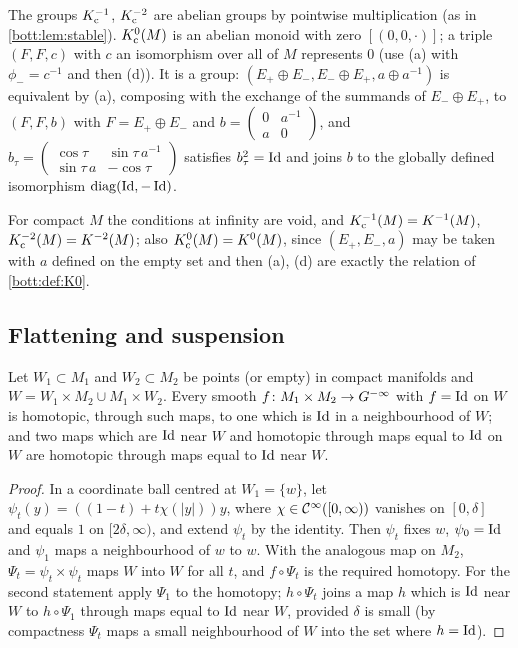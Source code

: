 The groups $K_{\mathrm{c}}^{-1}$, $K_{\mathrm{c}}^{-2}$ are abelian groups by pointwise multiplication (as in
\cref{bott:lem:stable}). $K_{\mathrm{c}}^0(M)$ is an abelian monoid with zero $[(0,0,\cdot)]$; a
triple $(F,F,c)$ with $c$ an isomorphism over all of $M$ represents $0$ (use (a) with
$\phi_-=c^{-1}$ and then (d)). It is a group: $(E_+\oplus E_-,E_-\oplus E_+,a\oplus a^{-1})$ is
equivalent by (a), composing with the exchange of the summands of $E_-\oplus E_+$, to
$(F,F,b)$ with $F=E_+\oplus E_-$ and $b=\begin{pmatrix}0&a^{-1}\\a&0\end{pmatrix}$, and
$b_\tau=\begin{pmatrix}\cos\tau&\sin\tau\,a^{-1}\\\sin\tau\,a&-\cos\tau\end{pmatrix}$ satisfies
$b_\tau^2=\operatorname{Id}$ and joins $b$ to the globally defined isomorphism $\operatorname{diag}(\operatorname{Id},-\operatorname{Id})$.

For compact $M$ the conditions at infinity are void, and $K_{\mathrm{c}}^{-1}(M)=K^{-1}(M)$,
$K_{\mathrm{c}}^{-2}(M)=K^{-2}(M)$; also $K_{\mathrm{c}}^0(M)=K^0(M)$, since $(E_+,E_-,a)$ may be taken with $a$
defined on the empty set and then (a), (d) are exactly the relation of \cref{bott:def:K0}.

\subsection{Flattening and suspension}
\begin{lemma}[Flattening]\label{bott:lem:flatten}
  Let $W_1\subset M_1$ and $W_2\subset M_2$ be points (or empty) in compact manifolds and
  $W=W_1\times M_2\cup M_1\times W_2$. Every smooth $f\colon M_1\times M_2\to G^{-\infty}$ with $f=\operatorname{Id}$
  on $W$ is homotopic, through such maps, to one which is $\operatorname{Id}$ in a neighbourhood of $W$;
  and two maps which are $\operatorname{Id}$ near $W$ and homotopic through maps equal to $\operatorname{Id}$ on $W$ are
  homotopic through maps equal to $\operatorname{Id}$ near $W$.
\end{lemma}
\begin{proof}
  In a coordinate ball centred at $W_1=\{w\}$, let $\psi_t(y)=((1-t)+t\chi(|y|))y$, where
  $\chi\in\mathcal{C}^\infty([0,\infty))$ vanishes on $[0,\delta]$ and equals $1$ on $[2\delta,\infty)$, and
  extend $\psi_t$ by the identity. Then $\psi_t$ fixes $w$, $\psi_0=\operatorname{Id}$ and $\psi_1$ maps a
  neighbourhood of $w$ to $w$. With the analogous map on $M_2$, $\Psi_t=\psi_t\times\psi_t$ maps
  $W$ into $W$ for all $t$, and $f\circ\Psi_t$ is the required homotopy. For the second
  statement apply $\Psi_1$ to the homotopy; $h\circ\Psi_t$ joins a map $h$ which is $\operatorname{Id}$
  near $W$ to $h\circ\Psi_1$ through maps equal to $\operatorname{Id}$ near $W$, provided $\delta$ is
  small (by compactness $\Psi_t$ maps a small neighbourhood of $W$ into the set where $h=\operatorname{Id}$).
\end{proof}


